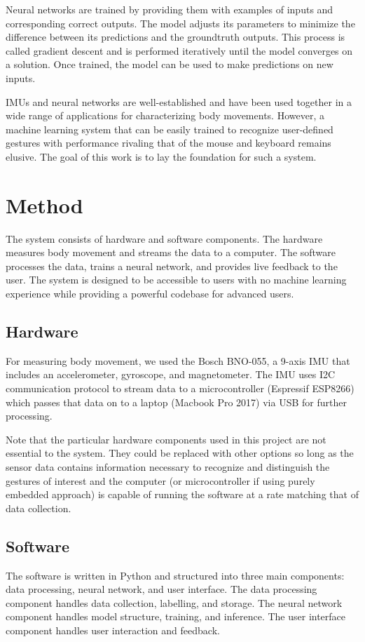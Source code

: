 \documentclass{article}
\begin{document}
Neural networks are trained by providing them with examples of inputs and corresponding correct outputs. The model adjusts its parameters to minimize the difference between its predictions and the groundtruth outputs. This process is called gradient descent and is performed iteratively until the model converges on a solution. Once trained, the model can be used to make predictions on new inputs.

IMUs and neural networks are well-established and have been used together in a wide range of applications for characterizing body movements. However, a machine learning system that can be easily trained to recognize user-defined gestures with performance rivaling that of the mouse and keyboard remains elusive. The goal of this work is to lay the foundation for such a system.

\section{Method}
The system consists of hardware and software components. The hardware measures body movement and streams the data to a computer. The software processes the data, trains a neural network, and provides live feedback to the user. The system is designed to be accessible to users with no machine learning experience while providing a powerful codebase for advanced users.

\subsection{Hardware}
For measuring body movement, we used the Bosch BNO-055, a 9-axis IMU that includes an accelerometer, gyroscope, and magnetometer. The IMU uses I2C communication protocol to stream data to a microcontroller (Espressif ESP8266) which passes that data on to a laptop  (Macbook Pro 2017) via USB for further processing.

Note that the particular hardware components used in this project are not essential to the system. They could be replaced with other options so long as the sensor data contains information necessary to recognize and distinguish the gestures of interest and the computer (or microcontroller if using purely embedded approach) is capable of running the software at a rate matching that of data collection.

\subsection{Software}
The software is written in Python and structured into three main components: data processing, neural network, and user interface. The data processing component handles data collection, labelling, and storage. The neural network component handles model structure, training, and inference. The user interface component handles user interaction and feedback.
\end{document}
